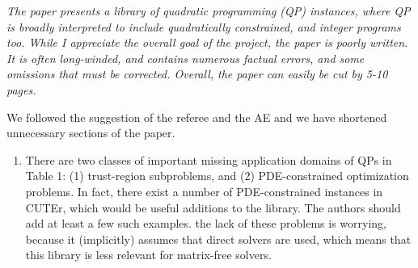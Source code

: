 \documentclass[11pt]{article}
\newcommand{\rep}[1]{{\textcolor{acblue}{#1}}}
\begin{document}
{\it
The paper presents a library of quadratic programming (QP) instances, where QP is broadly interpreted
to include quadratically constrained, and integer programs too. While I appreciate the overall goal of
the project, the paper is poorly written. It is often long-winded, and contains numerous factual errors,
and some omissions that must be corrected. Overall, the paper can easily be cut by 5-10 pages.
}

\rep{We followed the suggestion of the referee and the AE and we have shortened unnecessary sections of the paper.}

{\it
\begin{enumerate}

\item There are two classes of important missing application domains of QPs in Table 1: (1) trust-region subproblems, and (2) PDE-constrained optimization problems. In fact, there exist a number of PDE-constrained instances in CUTEr, which would be useful additions to the library. The authors should add at least a few such examples. the lack of these problems is worrying, because
it (implicitly) assumes that direct solvers are used, which means that this library is less relevant for matrix-free solvers.


\end{enumerate}}
\end{document}
